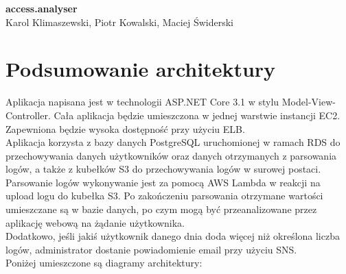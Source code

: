 \documentclass[12pt,a4paper]{article}
\begin{document}
    \begin{center}
        {\huge \textbf{access.analyser}}\\
        Karol Klimaszewski, Piotr Kowalski, Maciej Świderski
    \end{center}
    \section{Podsumowanie architektury}
        Aplikacja napisana jest w technologii ASP.NET Core 3.1 w stylu Model-View-Controller.
        Cała aplikacja będzie umieszczona w jednej warstwie instancji EC2.
        Zapewniona będzie wysoka dostępność przy użyciu ELB.\\
        Aplikacja korzysta z bazy danych PostgreSQL uruchomionej w ramach RDS do przechowywania danych użytkowników oraz danych otrzymanych z parsowania logów, a także z kubełków S3 do przechowywania logów w surowej postaci.\\
        Parsowanie logów wykonywanie jest za pomocą AWS Lambda w reakcji na upload logu do kubełka S3.
        Po zakończeniu parsowania otrzymane wartości umieszczane są w bazie danych, po czym mogą być przeanalizowane przez aplikację webową na żądanie użytkownika.\\
        Dodatkowo, jeśli jakiś użytkownik danego dnia doda więcej niż określona liczba logów, administrator dostanie powiadomienie email przy użyciu SNS.\\
        Poniżej umieszczone są diagramy architektury:
\end{document}
